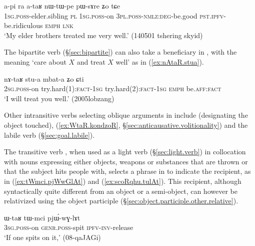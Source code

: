 \begin{exe}
\ex \label{ex:ataR.nWtWpe}
\gll  a-pi ra a-taʁ nɯ-tɯ-pe pɯ-sɤre ʑo tɕe  \\
\textsc{1sg}.\textsc{poss}-elder.sibling \textsc{pl} \textsc{1sg}.\textsc{poss}-on \textsc{3pl}.\textsc{poss}-\textsc{nmlz}:\textsc{deg}-be.good \textsc{pst}.\textsc{ipfv}-be.ridiculous \textsc{emph} \textsc{lnk} \\
\glt `My elder brothers treated me very well.' (140501 tshering skyid)
\end{exe}

The bipartite verb  (§\ref{sec:bipartite}) can also take a beneficiary in , with the meaning `care about $X$ and treat $X$ well' as in (\ref{ex:nAtaR.stua}).

\begin{exe}
\ex \label{ex:nAtaR.stua}
\gll nɤ-taʁ stu-a mbat-a ʑo ɕti\\
\textsc{2sg}.\textsc{poss}-on try.hard(1):\textsc{fact}-\textsc{1sg} try.hard(2):\textsc{fact}-\textsc{1sg} \textsc{emph} be.\textsc{aff}:\textsc{fact}\\
\glt `I will treat you well.' (2005lobzang)
\end{exe}


Other intransitive verbs selecting oblique arguments in  include  (designating the object touched),  (\ref{ex:WtaR.kondzoR}, §\ref{sec:anticausative.volitionality}) and the labile verb  (§\ref{sec:goal.labile}).

The transitive verb , when used as a light verb (§\ref{sec:light.verb}) in collocation with nouns expressing either objects, weapons or substances that are thrown or that the subject hits people with, selects a phrase in  to indicate the recipient, as in (\ref{ex:tWmci.pjWwGlAt}) and (\ref{ex:scoRqhu.tulAt}). This recipient, although syntactically quite different from an object or a semi-object, can however be relativized using the object participle (§\ref{sec:object.participle.other.relative}).

\begin{exe}
\ex \label{ex:tWmci.pjWwGlAt}
\gll ɯ-taʁ tɯ-mci pjɯ́-wɣ-lɤt \\
\textsc{3sg}.\textsc{poss}-on \textsc{genr}.\textsc{poss}-spit \textsc{ipfv}-\textsc{inv}-release \\
\glt `If one spits on it,' (08-qaJAGi) 
\end{exe}

